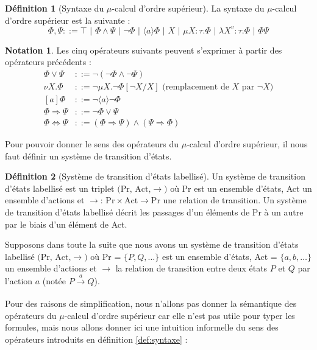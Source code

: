 \documentclass{rapport}
\theoremstyle{plain}
\theoremstyle{remark}
\theoremstyle{definition}
\newtheorem{notat}{Notation}
\newtheorem{dfn}{Définition}
\begin{document}
\begin{dfn}[Syntaxe du $\mu$-calcul d'ordre supérieur] La syntaxe du $\mu$-calcul d'ordre supérieur est la suivante :
\[\Phi, \Psi ::= \top \text{ | } \Phi \wedge \Psi \text{ | } \neg\Phi \text{ | } \langle a \rangle \Phi \text{ | } X \text{ | } \mu X : \tau . \Phi \text{ | } \lambda X^{v} : \tau . \Phi \text{ | } \Phi \Psi\]
\end{dfn}\label{def:syntaxe}

\begin{notat} Les cinq opérateurs suivants peuvent s'exprimer à partir des opérateurs précédents : 
\begin{align*}
	\Phi \vee \Psi &::= \neg (\neg \Phi \wedge \neg \Psi)\\
	\nu X . \Phi &::= \neg \mu X . \neg \Phi [\neg X/X] \text{ (remplacement de } X \text{ par } \neg X)\\
	[a] \Phi &::= \neg \langle a \rangle \neg \Phi\\
	\Phi \Rightarrow \Psi &::= \neg \Phi \vee \Psi\\
	\Phi \Leftrightarrow \Psi &::= (\Phi \Rightarrow \Psi) \wedge (\Psi \Rightarrow \Phi)
\end{align*}
\end{notat}

Pour pouvoir donner le sens des opérateurs du $\mu$-calcul d'ordre supérieur, il nous faut définir un système de transition d'états. 

\begin{dfn}[Système de transition d'états labellisé] Un système de transition d'états labellisé est un triplet $\text{(Pr, Act,} \rightarrow)$ où Pr est un ensemble d'états, Act un ensemble d'actions et ${\rightarrow \text{: Pr} \times \text{Act} \rightarrow \text{Pr}}$ une relation de transition. Un système de transition d'états labellisé décrit les passages d'un éléments de Pr à un autre par le biais d'un élément de Act.  
\end{dfn}

Supposons dans toute la suite que nous avons un système de transition d'états labellisé $\text{(Pr, Act,} \rightarrow)$ où Pr = $\{P, Q, \ldots\}$ est un ensemble d'états, Act = $\{a, b,\ldots\}$ un ensemble d'actions et $\rightarrow$ la relation de transition entre deux états $P$ et $Q$ par l'action $a$ (notée $P\xrightarrow[]{a} Q$).  

Pour des raisons de simplification, nous n'allons pas donner la sémantique des opérateurs du $\mu$-calcul d'ordre supérieur car elle n'est pas utile pour typer les formules, mais nous allons donner ici une intuition informelle du sens des opérateurs introduits en définition \ref{def:syntaxe} :
\end{document}
